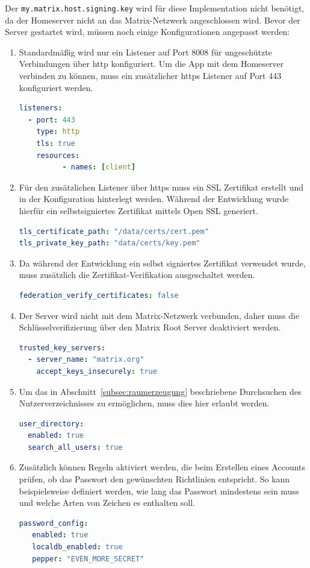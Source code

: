     Der \texttt{my.matrix.host.signing.key} wird für diese Implementation nicht benötigt, da der Homeserver nicht an das Matrix-Netzwerk angeschlossen wird.
    Bevor der Server gestartet wird, müssen noch einige Konfigurationen angepasst werden:
    \begin{enumerate}[label={(\arabic*)}]
        \item Standardmäßig wird nur ein Listener auf Port 8008 für ungeschützte Verbindungen über \ac{http} konfiguriert.
            Um die App mit dem Homeserver verbinden zu können, muss ein zusätzlicher \acs{https} Listener auf Port 443 konfiguriert werden.
        \begin{lstlisting}[language=yaml,label={lst:listener}]
listeners:
  - port: 443
    type: http
    tls: true
    resources:
          - names: [client]
            \end{lstlisting}
        \item Für den zusätzlichen Listener über \acs{https} muss ein SSL Zertifikat erstellt und in der Konfiguration hinterlegt werden. Während der Entwicklung wurde hierfür ein selbstsigniertes Zertifikat mittels Open SSL generiert.
            \begin{lstlisting}[language=yaml,label={lst:ssl-certificate}]
tls_certificate_path: "/data/certs/cert.pem"
tls_private_key_path: "data/certs/key.pem"
            \end{lstlisting}
        \item Da während der Entwicklung ein selbst signiertes Zertifikat verwendet wurde, muss zusätzlich die Zertifikat-Verifikation ausgeschaltet werden.
            \begin{lstlisting}[language=yaml,label={lst:disable-cert}]
federation_verify_certificates: false
            \end{lstlisting}
        \item Der Server wird nicht mit dem Matrix-Netzwerk verbunden, daher muss die Schlüsselverifizierung über den Matrix Root Server deaktiviert werden.
            \begin{lstlisting}[language=yaml,label={lst:disable-key-verification}]
trusted_key_servers:
  - server_name: "matrix.org"
    accept_keys_insecurely: true
            \end{lstlisting}
        \item Um das in Abschnitt~\ref{subsec:raumerzeugung} beschriebene Durchsuchen des Nutzerverzeichnisses zu ermöglichen, muss dies hier erlaubt werden.
            \begin{lstlisting}[language=yaml,label={lst:user-directory}]
user_directory:
  enabled: true
  search_all_users: true
            \end{lstlisting}
        \item Zusätzlich können Regeln aktiviert werden, die beim Erstellen eines Accounts prüfen, ob das Passwort den gewünschten Richtlinien entspricht.
                So kann beispielsweise definiert werden, wie lang das Passwort mindestens sein muss und welche Arten von Zeichen es enthalten soll.
            \begin{lstlisting}[language=yaml,label={lst:password-policy}]
password_config:
   enabled: true
   localdb_enabled: true
   pepper: "EVEN_MORE_SECRET"


\end{lstlisting}
\end{enumerate}
